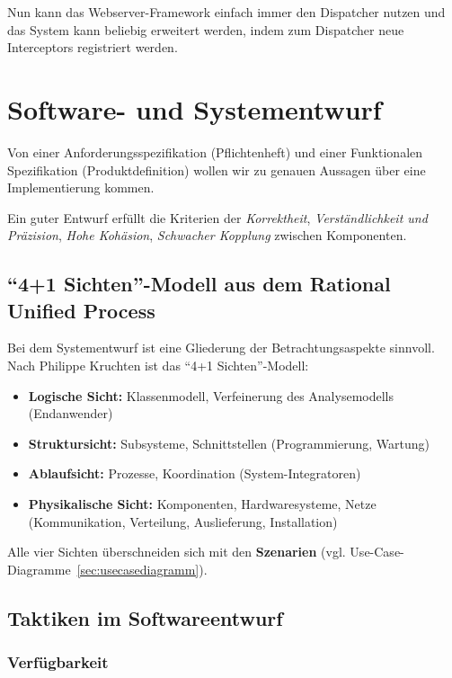 \documentclass{panikzettel}
\begin{document}
Nun kann das Webserver-Framework einfach immer den Dispatcher nutzen und das System kann beliebig erweitert werden, indem zum Dispatcher neue Interceptors registriert werden.

\section{Software- und Systementwurf}

Von einer Anforderungsspezifikation (Pflichtenheft) und einer Funktionalen Spezifikation (Produktdefinition) wollen wir zu genauen Aussagen über eine Implementierung kommen.

Ein guter Entwurf erfüllt die Kriterien der \emph{Korrektheit}, \emph{Verständlichkeit und Präzision}, \emph{Hohe Kohäsion}, \emph{Schwacher Kopplung} zwischen Komponenten.

\subsection{``4+1 Sichten''-Modell aus dem Rational Unified Process}

Bei dem Systementwurf ist eine Gliederung der Betrachtungsaspekte sinnvoll.
Nach Philippe Kruchten ist das ``4+1 Sichten''-Modell:

\begin{itemize}
  \item \textbf{Logische Sicht:} Klassenmodell, Verfeinerung des Analysemodells (Endanwender)
  \item \textbf{Struktursicht:} Subsysteme, Schnittstellen (Programmierung, Wartung)
  \item \textbf{Ablaufsicht:} Prozesse, Koordination (System-Integratoren)
  \item \textbf{Physikalische Sicht:} Komponenten, Hardwaresysteme, Netze (Kommunikation, Verteilung, Auslieferung, Installation)
\end{itemize}

Alle vier Sichten überschneiden sich mit den \textbf{Szenarien} (vgl. Use-Case-Diagramme~\ref{sec:usecasediagramm}).

\subsection{Taktiken im Softwareentwurf}

\subsubsection{Verfügbarkeit}
\end{document}
